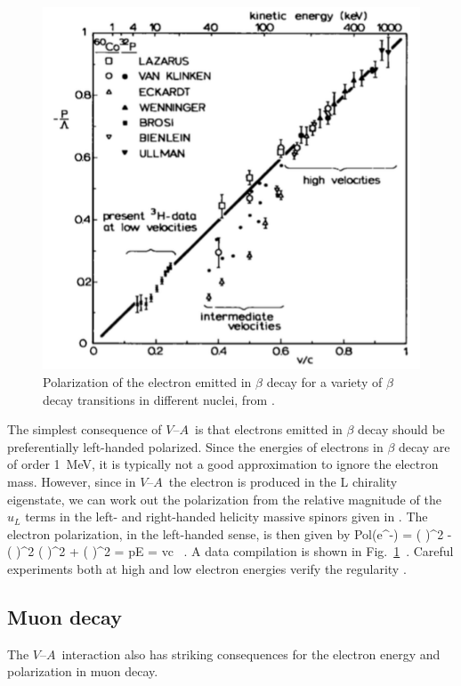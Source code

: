 \documentclass[12pt]{article}
\def\VmA{ $V$--$A$}
\begin{document}
\begin{figure}
\begin{center}
\includegraphics[width=0.50\hsize]{KandvK.pdf}
\end{center}
\caption{Polarization of the electron emitted in $\beta$ decay for a
  variety of $\beta$ decay transitions in different nuclei, from
  \cite{KandvK}.}
\label{fig:betapol}
\end{figure}

The simplest consequence of \VmA\ is that electrons emitted in $\beta$
decay should be preferentially left-handed polarized.   Since the
energies of electrons in $\beta$ decay are of order 1~MeV, it is
typically not a good approximation to ignore the electron mass.
However, since in \VmA\ the electron is produced in the L chirality
eigenstate,  we can work out the polarization from the relative magnitude
of the $u_L$ terms in the left- and right-handed helicity massive
spinors  given in .   The electron polarization, in the
left-handed
sense, is then given by 
\beq
     \mbox{Pol}(e^-) = { ( )^2 -  ( )^2 \over 
( )^2 +  ( )^2 } = {p\over E} =  {v\over c} \ . 
A data compilation is shown in Fig.~\ref{fig:betapol}~\cite{KandvK}.
Careful experiments both at high and low electron  energies verify the
regularity .



\subsection{Muon decay}

The \VmA\ interaction also has striking consequences for the electron
energy and polarization in muon decay. 
\end{document}
